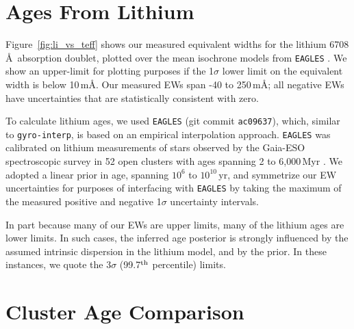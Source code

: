 \documentclass[11pt,twocolumn,tighten]{aastex63}
\begin{document}
\section{Ages From Lithium}
\label{sec:liage} 

Figure~\ref{fig:li_vs_teff} shows our measured equivalent widths for
the lithium 6708\,\AA\ absorption doublet, plotted over the mean
isochrone models from \texttt{EAGLES} \citep{Jeffries_2023}.  We
show an upper-limit for plotting purposes if the 1$\sigma$ lower
limit on the equivalent width is below 10\,m\AA.  Our measured EWs
span -40 to 250\,m\AA; all negative EWs have uncertainties that are
statistically consistent with zero.

To calculate lithium ages, we used \texttt{EAGLES} (git commit
\texttt{ac09637}), which, similar to \texttt{gyro-interp}, is based on
an empirical interpolation approach.  \texttt{EAGLES} 
was calibrated on lithium measurements of stars observed by the
Gaia-ESO spectroscopic survey in 52 open clusters with ages spanning 2
to 6{,}000\,Myr \citep{Jeffries_2023}.  We adopted a linear prior in
age, spanning $10^6$ to $10^{10}$\,yr, and symmetrize our EW
uncertainties for purposes of interfacing with \texttt{EAGLES} by
taking the maximum of the measured positive and negative 1$\sigma$
uncertainty intervals.

In part because many of our EWs are upper limits, many of the lithium
ages are lower limits.  In such cases,  the inferred age posterior is
strongly influenced by the assumed intrinsic dispersion in
the lithium model, and by the prior.  In these instances, we
quote the 3$\sigma$ (99.7$^{\rm th}$ percentile) limits.



\section{Cluster Age Comparison}
\label{sec:litagecomparison}
\end{document}
